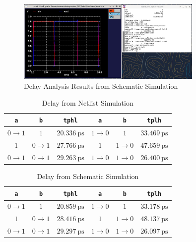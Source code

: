 \documentclass{article}
\begin{document}
	\begin{figure}[H]
		\centerline{\includegraphics[width=0.8\textwidth]{nand_delay_analysis_schem.png}}
		\caption{Delay Analysis Results from Schematic Simulation}
		\label{fig::nand_delay_analysis_schem}
	\end{figure}
	
	\begin{table}[H]
	\begin{center}
	\caption{Delay from Netlist Simulation}
	\label{table::nand_gate_delay_analysis}
	\begin{tabular}{| c | c | c || c | c | c |}
		\hline
		\texttt{a} & \texttt{b} & \texttt{tphl} & \texttt{a} & \texttt{b} & \texttt{tplh} \\
		\hline	
		$0 \rightarrow 1$ & $1$ & $20.336\ \text{ps}$ & $1 \rightarrow 0$ & $1$ & $33.469\ \text{ps}$\\
		\hline	
		$1$ & $0 \rightarrow 1$ & $27.766\ \text{ps}$ & $1$ & $1 \rightarrow 0$ & $47.659\ \text{ps}$\\
		\hline	
		$0 \rightarrow 1$ & $0 \rightarrow 1$ & $29.263\ \text{ps}$ & $1 \rightarrow 0$ & $1 \rightarrow 0$ & $26.400\ \text{ps}$\\
		\hline
	\end{tabular}
	\end{center}
	\end{table}
	
	\begin{table}[H]
	\begin{center}
	\caption{Delay from Schematic Simulation}
	\label{table::nand_gate_delay_analysis_schem}
	\begin{tabular}{| c | c | c || c | c | c |}
		\hline
		\texttt{a} & \texttt{b} & \texttt{tphl} & \texttt{a} & \texttt{b} & \texttt{tplh} \\
		\hline	
		$0 \rightarrow 1$ & $1$ & $20.859\ \text{ps}$ & $1 \rightarrow 0$ & $1$ & $33.178\ \text{ps}$\\
		\hline	
		$1$ & $0 \rightarrow 1$ & $28.416\ \text{ps}$ & $1$ & $1 \rightarrow 0$ & $48.137\ \text{ps}$\\
		\hline	
		$0 \rightarrow 1$ & $0 \rightarrow 1$ & $29.297\ \text{ps}$ & $1 \rightarrow 0$ & $1 \rightarrow 0$ & $26.097\ \text{ps}$\\
		\hline
	\end{tabular}
	\end{center}
	\end{table}
	
\end{document}
